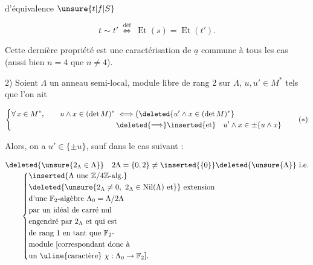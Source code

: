 

d'équivalence  $\unsure{t|f|S}$

\[
t\sim t'\ \overset{\mathrm{déf}}{\Longleftrightarrow}\ \operatorname{Et}(s)=\operatorname{Et}(t').
\]

Cette dernière propriété est une caractérisation de $\underline a$ commune à tous les cas (aussi bien $n=4$ que $n\ne4$).

2) Soient $\Lambda$ un anneau semi-local,  module libre de rang 2 sur $\Lambda$, $u,u'\in M^*$ tels que l'on ait

\[
\left\{\begin{aligned}
&\forall\,x\in M^*,\qquad u\wedge x\in(\det M)^*\ \Longleftrightarrow
\bigl(\deleted{u'\wedge x\in(\det M)^*}\\
&\hspace{14em}\deleted{\Longrightarrow}\inserted{\text{et}}\quad u'\wedge x\in\pm\{u\wedge x\}
\end{aligned}\right.\tag*{$(*)$}
\]


Alors, on a $u'\in\{\pm u\}$, sauf dans le cas suivant :

\[
\begin{aligned}
&\deleted{\unsure{2_\Lambda\in\Lambda}}\quad 2\Lambda=\{0,2\}\ne\inserted{\{0\}}\deleted{\unsure{\Lambda}}\ \text{i.e.}\\[-2pt]
&\qquad\left\{\begin{aligned}
&\inserted{\Lambda\ \text{une }\mathbb Z/4\mathbb Z\text{-alg.}}\\
&\deleted{\unsure{2_\Lambda\ne0,\ 2_\Lambda\in\operatorname{Nil}(\Lambda)\ \text{et}}}\ \text{extension}\\
&\text{d'une }\mathbb F_2\text{-algèbre }\Lambda_0=\Lambda/2\Lambda\\
&\text{par un idéal de carré nul}\\
&\text{engendré par }2_\Lambda\ \text{et qui est}\\
&\text{de rang }1\ \text{en tant que }\mathbb F_2\text{-}\\
&\text{module [correspondant donc à}\\
&\text{un \uline{caractère} }\chi:\Lambda_0\to\mathbb F_2].
\end{aligned}\right.
\end{aligned}
\]

